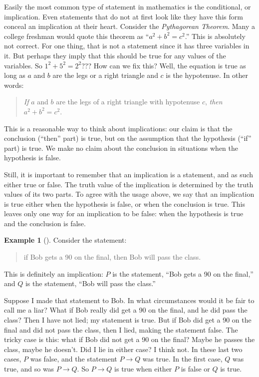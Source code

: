 \documentclass[10pt,]{book}
\theoremstyle{plain}
\theoremstyle{definition}
\newtheorem{example}[theorem]{Example}
\theoremstyle{definition}
\theoremstyle{definition}
\numberwithin{equation}{section}
\def\imp{\rightarrow}
\begin{document}
      Easily the most common type of statement in mathematics is the conditional, or implication. Even statements that do not at first look like they have this form conceal an implication at their heart. Consider the \emph{Pythagorean Theorem}. Many a college freshman would quote this theorem as ``\(a^2 + b^2 = c^2\).'' This is absolutely not correct. For one thing, that is not a statement since it has three variables in it. But perhaps they imply that this should be true for any values of the variables. So \(1^2 + 5^2 = 2^2\)??? How can we fix this? Well, the equation is true as long as \(a\) and \(b\) are the legs or a right triangle and \(c\) is the hypotenuse. In other words:

      \begin{quote}\emph{If }\(a\) and \(b\) are the legs of a right triangle with hypotenuse \(c\), \emph{then}\(a^2 + b^2 = c^2\).
      \end{quote}

\par

      This is a reasonable way to think about implications: our claim is that the conclusion (``then'' part) is true, but on the assumption that the hypothesis (``if'' part) is true. We make no claim about the conclusion in situations when the hypothesis is false.
\par

      Still, it is important to remember that an implication is a statement, and as such either true or false. The truth value of the implication is determined by the truth values of its two parts. To agree with the usage above, we say that an implication is true either when the hypothesis is false, or when the conclusion is true. This leaves only one way for an implication to be false: when the hypothesis is true and the conclusion is false.
\begin{example}[]\label{example-2}
Consider the statement:
          \begin{quote}if Bob gets a 90 on the final, then Bob will pass the class.\end{quote}
 This is definitely an implication: \(P\) is the statement, ``Bob gets a 90 on the final,'' and \(Q\) is the statement, ``Bob will pass the class.'' %
\par
 Suppose I made that statement to Bob. In what circumstances would it be fair to call me a liar? What if Bob really did get a 90 on the final, and he did pass the class? Then I have not lied; my statement is true. But if Bob did get a 90 on the final and did not pass the class, then I lied, making the statement false. The tricky case is this: what if Bob did not get a 90 on the final? Maybe he passes the class, maybe he doesn't. Did I lie in either case? I think not. In these last two cases, \(P\) was false, and the statement \(P \imp Q\) was true. In the first case, \(Q\) was true, and so was \(P \imp Q\). So \(P \imp Q\) is true when either \(P\) is false or \(Q\) is true.
\end{example}
\par
\end{document}
